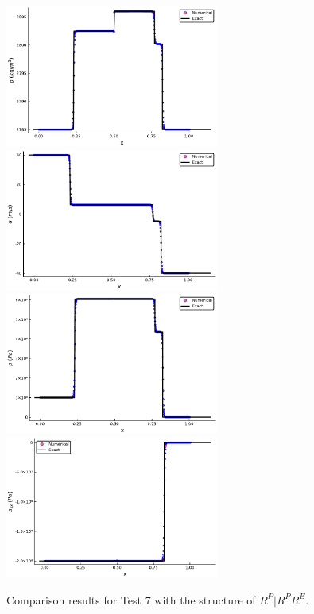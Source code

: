 \documentclass{article}
\numberwithin{equation}{section}
\numberwithin{table}{section}
\begin{document}
\begin{figure}[ht]
  \centering

  \includegraphics[width= 7cm] {case5rho.pdf}
  \includegraphics[width= 7cm] {case5u.pdf}
  \includegraphics[width= 7cm] {case5p.pdf}
  \includegraphics[width= 7cm] {case5sxx.pdf}

    \caption{Comparison results for Test 7 with the structure of $R^P|R^PR^E$.  }
  \label{fig:case5}
\end{figure}
\end{document}

